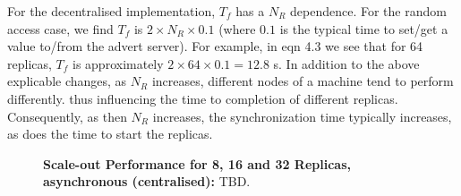 \documentclass{rspublic}
\newcommand{\jhanote}[1]{ {\textcolor{red} { ***shantenu: #1 }}}
\newcommand{\alnote}[1]{ {\textcolor{blue} { ***andre: #1 }}}
\newcommand{\alnote}[1]{}
\newcommand{\jhanote}[1]{}
\begin{document}
For the decentralised implementation, $T_f$ has a $N_R$ dependence. 
For the random access case, we find $T_f$ is $2 \times N_R \times
0.1$ (where $0.1$ is the typical time to set/get a value to/from the
advert server).  For example, in eqn 4.3 we see that for 64 replicas, $T_f$ is
 approximately $2 \times 64 \times 0.1 = 12.8$ s. 
In addition to the above explicable changes, as $N_R$ increases,
different nodes of a machine tend to perform differently.  thus
influencing the time to completion of different replicas.
Consequently, as then $N_R$ increases, the synchronization time
typically increases, as does the time to start the replicas.




%
\begin{figure}%
\centering
{}\qquad
\caption{\textbf{Scale-out Performance for 8, 16 and 32 Replicas, asynchronous (centralised):} 
  TBD.}
\label{fig:24machines}


\end{figure}
\end{document}
